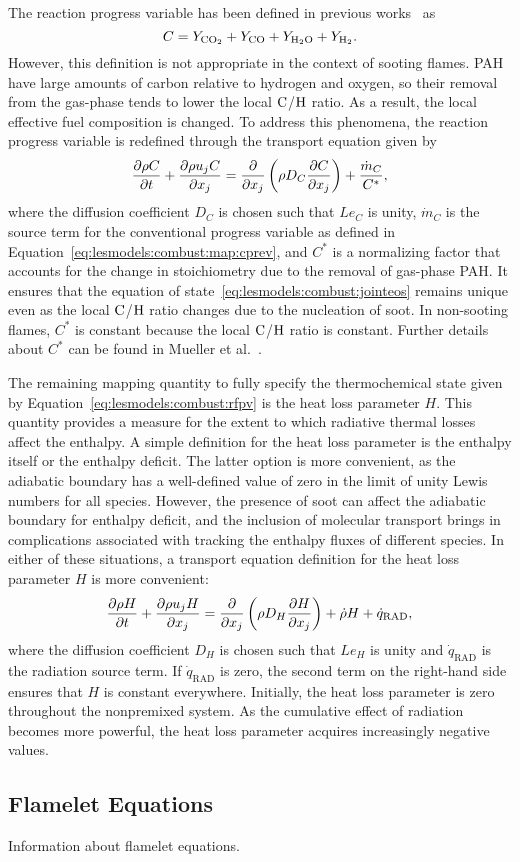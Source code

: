 The reaction progress variable has been defined in previous works~\cite{pierce2004,ihme2008} as
\begin{equation}\label{eq:lesmodels:combust:map:cprev}
  C = Y_{\ce{CO2}} + Y_{\ce{CO}} + Y_{\ce{H2O}} + Y_{\ce{H2}}.
\end{equation}
However, this definition is not appropriate in the context of sooting flames. PAH have large amounts of carbon relative to hydrogen and oxygen, so their removal from the gas-phase tends to lower the local $\ce{C}$/$\ce{H}$ ratio. As a result, the local effective fuel composition is changed. To address this phenomena, the reaction progress variable is redefined through the transport equation given by
\begin{equation}\label{eq:lesmodels:combust:map:c}
  \trder{C} = \pder[]{x_j}\left( \rho D_C \pder[C]{x_j} \right) + \frac{\dot{m}_{C}}{C^*},
\end{equation}
where the diffusion coefficient $D_C$ is chosen such that $Le_C$ is unity, $\dot{m}_C$ is the source term for the conventional progress variable as defined in Equation~\ref{eq:lesmodels:combust:map:cprev}, and $C^*$ is a normalizing factor that accounts for the change in stoichiometry due to the removal of gas-phase PAH. It ensures that the equation of state~\ref{eq:lesmodels:combust:jointeos} remains unique even as the local $\ce{C}$/$\ce{H}$ ratio changes due to the nucleation of soot. In non-sooting flames, $C^*$ is constant because the local $\ce{C}$/$\ce{H}$ ratio is constant. Further details about $C^*$ can be found in Mueller et al.~\cite{mueller2012}.

The remaining mapping quantity to fully specify the thermochemical state given by Equation~\ref{eq:lesmodels:combust:rfpv} is the heat loss parameter $H$. This quantity provides a measure for the extent to which radiative thermal losses affect the enthalpy. A simple definition for the heat loss parameter is the enthalpy itself or the enthalpy deficit. The latter option is more convenient, as the adiabatic boundary has a well-defined value of zero in the limit of unity Lewis numbers for all species. However, the presence of soot can affect the adiabatic boundary for enthalpy deficit, and the inclusion of molecular transport brings in complications associated with tracking the enthalpy fluxes of different species. In either of these situations, a transport equation definition for the heat loss parameter $H$ is more convenient:
\begin{equation}\label{eq:lesmodels:combust:map:heatloss}
  \trder{H} = \pder[]{x_j}\left( \rho D_H \pder[H]{x_j} \right) + \dot{\rho}H + \dot{q}_{\text{RAD}},
\end{equation}
where the diffusion coefficient $D_H$ is chosen such that $Le_H$ is unity and $\dot{q}_{\text{RAD}}$ is the radiation source term. If $\dot{q}_{\text{RAD}}$ is zero, the second term on the right-hand side ensures that $H$ is constant everywhere. Initially, the heat loss parameter is zero throughout the nonpremixed system. As the cumulative effect of radiation becomes more powerful, the heat loss parameter acquires increasingly negative values.


\subsection{Flamelet Equations}
\label{sec:lesmodels:combust:flamelet}

Information about flamelet equations.
